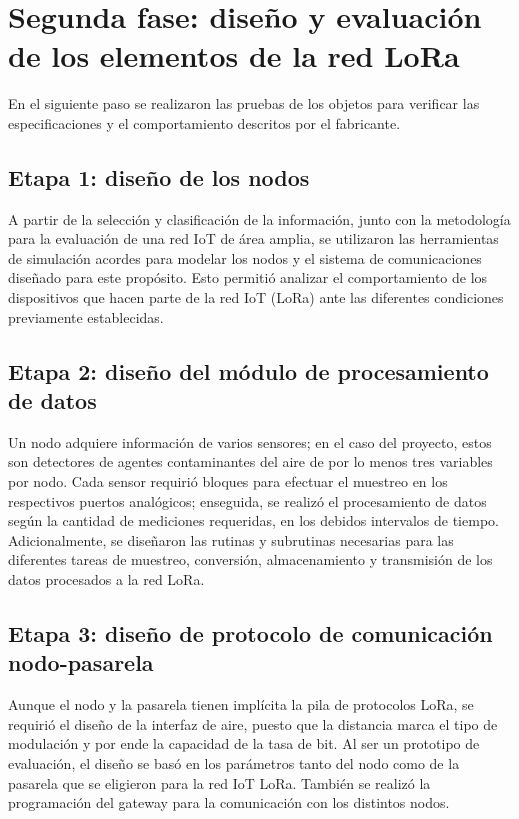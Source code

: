 \section{Segunda fase: diseño y evaluación de los elementos de la red LoRa }

En el siguiente paso se realizaron las pruebas de los objetos para verificar las especificaciones y el comportamiento descritos por el fabricante. 

\subsection{Etapa 1: diseño de los nodos}

A partir de la selección y clasificación de la información, junto con la metodología para la evaluación de una red IoT de área amplia, se utilizaron las herramientas de simulación acordes para modelar los nodos y el sistema de comunicaciones diseñado para este propósito. Esto permitió analizar el comportamiento de los dispositivos que hacen parte de la red IoT (LoRa) ante las diferentes condiciones previamente establecidas.

\subsection{Etapa 2: diseño del módulo de procesamiento de datos}

Un nodo adquiere información de varios sensores; en el caso del proyecto, estos son detectores de agentes contaminantes del aire de por lo menos tres variables por nodo. Cada sensor requirió bloques para efectuar el muestreo en los respectivos puertos analógicos; enseguida, se realizó el procesamiento de datos según la cantidad de mediciones requeridas, en los debidos intervalos de tiempo. Adicionalmente, se diseñaron las rutinas y subrutinas necesarias para las diferentes tareas de muestreo, conversión, almacenamiento y transmisión de los datos procesados a la red LoRa.

\subsection{Etapa 3: diseño de protocolo de comunicación nodo-pasarela }

Aunque el nodo y la pasarela tienen implícita la pila de protocolos LoRa, se requirió el diseño de la interfaz de aire, puesto que la distancia marca el tipo de modulación y por ende la capacidad de la tasa de bit. Al ser un prototipo de evaluación, el diseño se basó en los parámetros tanto del nodo como de la pasarela que se eligieron para la red IoT LoRa. También se realizó la programación del gateway para la comunicación con los distintos nodos.

